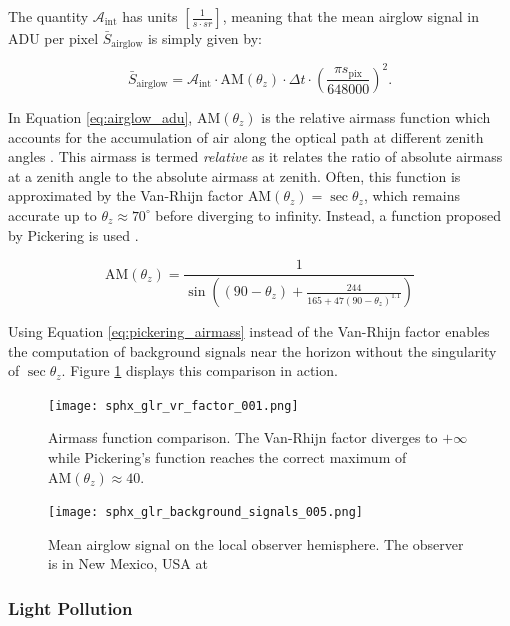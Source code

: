 The quantity $\mathcal{A}_\mathrm{int}$ has units $\left[ \frac{1}{s\cdot sr} \right]$, meaning that the mean airglow signal in ADU per pixel $\bar{S}_\mathrm{airglow}$ is simply given by:

\begin{equation} \label{eq:airglow_adu}
  \bar{S}_\mathrm{airglow} = \mathcal{A}_\mathrm{int} \cdot \textrm{AM}(\theta_z) \cdot \Delta t \cdot \left( \frac{\pi s_\mathrm{pix}}{648000} \right)^2.
\end{equation}

In Equation \ref{eq:airglow_adu}, $\textrm{AM}(\theta_z)$ is the relative airmass function which accounts for the accumulation of air along the optical path at different zenith angles \cite{frueh2019notes}. This airmass is termed \textit{relative} as it relates the ratio of absolute airmass at a zenith angle to the absolute airmass at zenith. Often, this function is approximated by the Van-Rhijn factor $\textrm{AM}(\theta_z) = \sec{\theta_z}$, which remains accurate up to $\theta_z \approx 70^\circ$ before diverging to infinity. Instead, a function proposed by Pickering is used \cite{pickering2002}.

\begin{equation} \label{eq:pickering_airmass}
  \textrm{AM}(\theta_z) = \frac{1}{\sin\left((90 - \theta_z) +  \frac{244}{165 + 47 \left(90 - \theta_z \right)^{1.1}}\right)}
\end{equation}


Using Equation \ref{eq:pickering_airmass} instead of the Van-Rhijn factor enables the computation of background signals near the horizon without the singularity of $\sec \theta_z$. Figure \ref{fig:airmass_fcns} displays this comparison in action.

\begin{figure}[ht]
  \centering
  \texttt{[image: sphx\_glr\_vr\_factor\_001.png]}
  \caption{Airmass function comparison. The Van-Rhijn factor diverges to $+\infty$ while Pickering's function reaches the correct maximum of $\textrm{AM}(\theta_z) \approx 40$.}
  \label{fig:airmass_fcns}
\end{figure}

\begin{figure}[ht]
  \centering
  \texttt{[image: sphx\_glr\_background\_signals\_005.png]}
  \caption{Mean airglow signal on the local observer hemisphere. The observer is in New Mexico, USA at
  \pogslla}
  \label{fig:airglowhemi}
\end{figure}

\subsubsection{Light Pollution}

